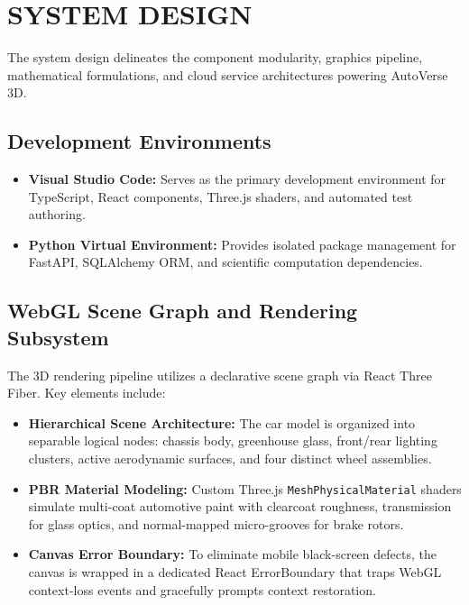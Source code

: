 \documentclass[12pt,a4paper]{report}
\begin{document}
\chapter{SYSTEM DESIGN}

The system design delineates the component modularity, graphics pipeline, mathematical formulations, and cloud service architectures powering AutoVerse 3D.

\section{Development Environments}
\begin{itemize}
    \item \textbf{Visual Studio Code:} Serves as the primary development environment for TypeScript, React components, Three.js shaders, and automated test authoring.
    \item \textbf{Python Virtual Environment:} Provides isolated package management for FastAPI, SQLAlchemy ORM, and scientific computation dependencies.
\end{itemize}

\section{WebGL Scene Graph and Rendering Subsystem}
The 3D rendering pipeline utilizes a declarative scene graph via React Three Fiber. Key elements include:
\begin{itemize}
    \item \textbf{Hierarchical Scene Architecture:} The car model is organized into separable logical nodes: chassis body, greenhouse glass, front/rear lighting clusters, active aerodynamic surfaces, and four distinct wheel assemblies.
    \item \textbf{PBR Material Modeling:} Custom Three.js \texttt{MeshPhysicalMaterial} shaders simulate multi-coat automotive paint with clearcoat roughness, transmission for glass optics, and normal-mapped micro-grooves for brake rotors.
    \item \textbf{Canvas Error Boundary:} To eliminate mobile black-screen defects, the canvas is wrapped in a dedicated React ErrorBoundary that traps WebGL context-loss events and gracefully prompts context restoration.
\end{itemize}
\end{document}
